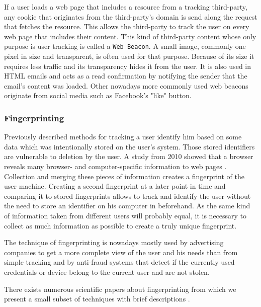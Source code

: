 	If a user loads a web page that includes a resource from a tracking third-party, any cookie that originates from the third-party's domain is send along the request that fetches the resource. This allows the third-party to track the user on every web page that includes their content. This kind of third-party content whose only purpose is user tracking is called a \texttt{Web Beacon}. A small image, commonly one pixel in size and transparent, is often used for that purpose. Because of its size it requires less traffic and its transparency hides it from the user. It is also used in HTML emails and acts as a read confirmation by notifying the sender that the email's content was loaded. Other nowadays more commonly used web beacons originate from social media such as Facebook's "like" button. 

\subsubsection{Fingerprinting}
\label{sec:fingerprinting}

	Previously described methods for tracking a user identify him based on some data which was intentionally stored on the user's system. Those stored identifiers are vulnerable to deletion by the user. A study from 2010 showed that a browser reveals many browser- and computer-specific information to web pages \cite{Eckersley:2010:UYW:1881151.1881152}. Collection and merging these pieces of information creates a fingerprint of the user machine. Creating a second fingerprint at a later point in time and comparing it to stored fingerprints allows to track and identify the user without the need to store an identifier on his computer in beforehand. As the same kind of information taken from different users will probably equal, it is necessary to collect as much information as possible to create a truly unique fingerprint. 
	
	The technique of fingerprinting is nowadays mostly used by advertising companies to get a more complete view of the user and his needs than from simple tracking and by anti-fraud systems that detect if the currently used credentials or device belong to the current user and are not stolen.

	There exists numerous scientific papers about fingerprinting from which we present a small subset of techniques with brief descriptions \cite{paulstone_historysniffing, MBYS11, Nikiforakis:2013:CME:2497621.2498133, Eckersley:2010:UYW:1881151.1881152, MS12, olejnik:hal-00747841}. 
	
